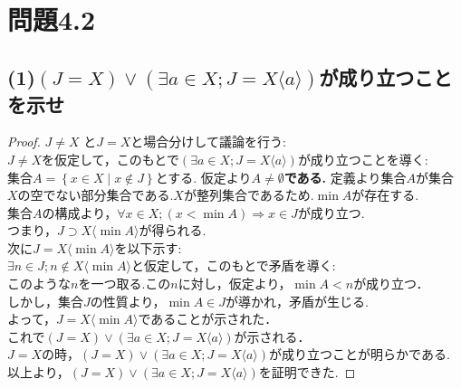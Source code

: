 \documentclass{jreport}
\begin{document}
\section{問題4.2}
\subsection{\normalsize{(1)$(J=X)\lor (\exists a \in X; J=X\langle a \rangle)$が成り立つことを示せ}}
\begin{proof}
  $J \ne X$ と$J =X$と場合分けして議論を行う:\\
  $J \ne X $を仮定して，このもとで$(\exists a \in X; J=X\langle a \rangle)$が成り立つことを導く:\\
  集合$A = \left\{ x \in X \mid x \notin J \right\}$とする. 仮定より\textbf{$A \ne \emptyset$である.} 定義より集合$A$が集合$X$の空でない部分集合である.$X$が整列集合であるため.$\min A$が存在する.\\
  集合$A$の構成より，$\forall x \in X ; (x < \min A )\Rightarrow x \in J$が成り立つ.\\
  つまり，$J \supset X \langle \min A \rangle $が得られる.\\
  次に$J = X \langle \min A \rangle $を以下示す:\\
  $\exists n \in J ; n \notin X \langle \min A \rangle$と仮定して，このもとで矛盾を導く:\\
  このような$n$を一つ取る.この$n$に対し，仮定より，$ \min A < n$が成り立つ．\\
  しかし，集合$J$の性質より，$ \min A \in J$が導かれ，矛盾が生じる.\\
  よって，$J=X \langle \min A \rangle$であることが示された．\\
  これで$(J=X)\lor (\exists a \in X; J=X\langle a \rangle)$が示される．\\
  $J=X$の時，$(J=X)\lor (\exists a \in X; J=X\langle a \rangle)$が成り立つことが明らかである.\\
	以上より，$(J=X)\lor (\exists a \in X; J=X\langle a \rangle)$を証明できた.
\end{proof}
\newpage
\end{document}
